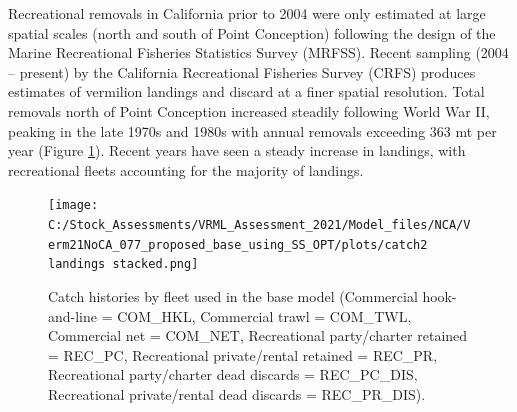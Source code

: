 \documentclass[11pt,
  english,
  a4paper,
]{article}
\begin{document}
Recreational removals in California prior to 2004 were only estimated at large spatial scales (north and south of Point Conception) following the design of the Marine Recreational Fisheries Statistics Survey (MRFSS). Recent sampling (2004 -- present) by the California Recreational Fisheries Survey (CRFS) produces estimates of vermilion landings and discard at a finer spatial resolution. Total removals north of Point Conception increased steadily following World War II, peaking in the late 1970s and 1980s with annual removals exceeding 363 mt per year (Figure \ref{fig:catch}). Recent years have seen a steady increase in landings, with recreational fleets accounting for the majority of landings.

\FloatBarrier

\begin{figure}
\centering
\texttt{[image: C:/Stock\_Assessments/VRML\_Assessment\_2021/Model\_files/NCA/Verm21NoCA\_077\_proposed\_base\_using\_SS\_OPT/plots/catch2 landings stacked.png]}
\caption{Catch histories by fleet used in the base model (Commercial hook-and-line = COM\_HKL, Commercial trawl = COM\_TWL, Commercial net = COM\_NET, Recreational party/charter retained = REC\_PC, Recreational private/rental retained = REC\_PR, Recreational party/charter dead discards = REC\_PC\_DIS, Recreational private/rental dead discards = REC\_PR\_DIS).\label{fig:catch}}
\end{figure}
\end{document}
